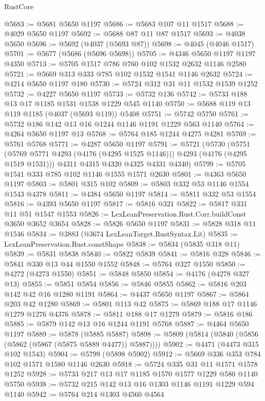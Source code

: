 \begin{lexlean}{RustCore}
\begin{coremodule}
@5683 := @5681 @5650 @1197
@5686 := @5683 @107 @11 @1517
@5688 := @4029 @5650 @1197
@5692 := @5688 @87 @11 @87 @1517
@5693 := @4038 @5650
@5696 := @5692 (@4037 (@5693 @87))
@5698 := @4045 (@4046 @1517)
@5701 := @5677 (@5686 (@5696 @5698))
@5705 := @4346 @5650 @1197 @1197 @4350
@5713 := @5705 @1517 @786 @760 @102 @1532 @2632 @1146 @2580
@5721 := @5669 @313 @333 @785 @102 @1532 @1541 @1146 @2632
@5724 := @4214 @5650 @1197 @180
@5730 := @5724 @312 @31 @11 @1532 @1539 @1252
@5732 := @4227 @5650 @1197
@5733 := @5732 @136
@5742 := @5733 @188 @13 @17 @1185 @1531 @1538 @1229 @545 @1140
@5750 := @5688 @119 @13 @119 @1185 (@4037 (@5693 @119)) @5408
@5751 := @5742 @5750
@5761 := @5732 @186 @142 @13 @16 @1244 @1146 @1191 @1229 @563 @1140
@5764 := @4264 @5650 @1197 @13
@5768 := @5764 @185 @1244 @4275 @4281
@5769 := @5761 @5768
@5771 := @4287 @5650 @1197
@5791 := @5721
    (@5730
      (@5751 (@5769 @5771 @4293 (@4176 (@4295 @1525 @1146))) @4293 (@4176 (@4295 @1519 @1531)))
      @4311
      @4315
      @4320
      @4325
      @4331
      @4340)
@5799 := @5705 @1541 @333 @785 @102 @1146 @1555 @1571 @2630
@5801 := @4363 @5650 @1197
@5803 := @5801 @315 @102
@5809 := @5803 @332 @53 @1146 @1554 @1543 @4378
@5811 := @4384 @5650 @1197
@5814 := @5811 @332 @53 @1554
@5816 := @4393 @5650 @1197
@5817 := @5816 @321
@5822 := @5817 @331 @11 @51 @1547 @1553
@5826 := LexLeanPreservation.Rust.Corr.buildConst @3650 @3652 @3654
@5828 := @5826 @5650 @1197
@5831 := @5828 @318 @11 @1546
@5834 := @3883 (@3674 LexLeanTarget.RustSyntax.Lit)
@5835 := LexLeanPreservation.Rust.constShape
@5838 := @5834 (@5835 @318 @11)
@5839 := @5831 @5838
@5840 := @5822 @5839
@5841 := @5816 @328
@5846 := @5841 @330 @13 @44 @1550 @1552
@5848 := @5764 @327 @1550
@5850 := @4272 (@4273 @1550)
@5851 := @5848 @5850
@5854 := @4176 (@4278 @327 @13)
@5855 := @5851 @5854
@5856 := @5846 @5855
@5862 := @5816 @203 @142 @42 @16 @1280 @1191
@5864 := @4437 @5650 @1197
@5867 := @5864 @203 @42 @1280
@5869 := @5801 @113 @42
@5875 := @5869 @188 @17 @1146 @1279 @1276 @4376
@5878 := @5811 @188 @17 @1279
@5879 := @5816 @186
@5885 := @5879 @142 @13 @16 @1244 @1191 @5768
@5887 := @4464 @5650 @1197
@5889 := @5878 (@5885 @5887)
@5898 := @5809 (@5814 (@5840 (@5856 (@5862 (@5867 (@5875 @5889 @4477)) @5887))))
@5902 := @4471 (@4473 @315 @102 @1543)
@5904 := @5799 (@5898 @5902)
@5912 := @5669 @336 @353 @784 @102 @1571 @1580 @1146 @2630
@5918 := @5724 @335 @31 @11 @1571 @1578 @1252
@5928 := @5733 @217 @13 @17 @1185 @1570 @1577 @1229 @580 @1140 @5750
@5938 := @5732 @215 @142 @13 @16 @1303 @1146 @1191 @1229 @594 @1140
@5942 := @5764 @214 @1303 @4560 @4564

\end{coremodule}
\end{lexlean}
